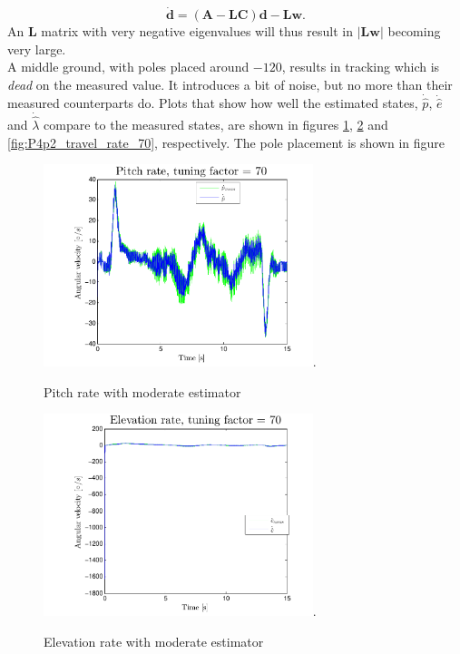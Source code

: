 \begin{equation}
    \mathbf{\dot{d}} = (\mathbf{A} - \mathbf{LC})\mathbf{d} - \mathbf{Lw}.
\end{equation}
An $\mathbf{L}$ matrix with very negative eigenvalues will thus result in $|\mathbf{Lw}|$ becoming very large.\\ 
A middle ground, with poles placed around $-120$, results in tracking which is \textit{dead} on the measured value. It introduces a bit of noise, but no more than their measured counterparts do. Plots that show how well the estimated states, $\dot{\hat{p}}$, $\dot{\hat{e}}$ and $\dot{\hat{\lambda}}$ compare to the measured states, are shown in figures \ref{fig:P4p2_pitch_rate_70}, \ref{fig:P4p2_elevation_rate_70} and \ref{fig:P4p2_travel_rate_70}, respectively. The pole placement is shown in figure 
\begin{figure}[htb]
	\centering
		\includegraphics[width=0.7\textwidth,trim={0cm 0cm 0cm 0cm},clip]{figures/P4p2_pitch_rate_tuning_factor_70.pdf}.
	\caption{Pitch rate with moderate estimator}
\label{fig:P4p2_pitch_rate_70}
\end{figure}
\begin{figure}[htb]
	\centering
		\includegraphics[width=0.7\textwidth,trim={0cm 0cm 0cm 0cm},clip]{figures/P4p2_elevation_rate_tuning_factor_70.pdf}.
	\caption{Elevation rate with moderate estimator}
\label{fig:P4p2_elevation_rate_70}
\end{figure}
